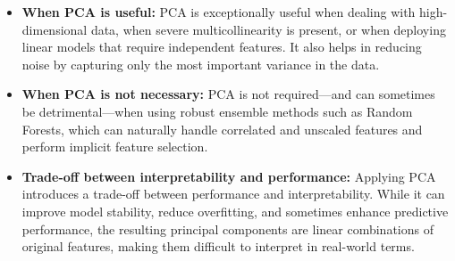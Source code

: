 \documentclass[11pt]{article}
\begin{document}
\begin{itemize}
    \item \textbf{When PCA is useful:} PCA is exceptionally useful when dealing with high-dimensional data, when severe multicollinearity is present, or when deploying linear models that require independent features. It also helps in reducing noise by capturing only the most important variance in the data.

    \item \textbf{When PCA is not necessary:} PCA is not required—and can sometimes be detrimental—when using robust ensemble methods such as Random Forests, which can naturally handle correlated and unscaled features and perform implicit feature selection.

    \item \textbf{Trade-off between interpretability and performance:} Applying PCA introduces a trade-off between performance and interpretability. While it can improve model stability, reduce overfitting, and sometimes enhance predictive performance, the resulting principal components are linear combinations of original features, making them difficult to interpret in real-world terms.
\end{itemize}
\end{document}
